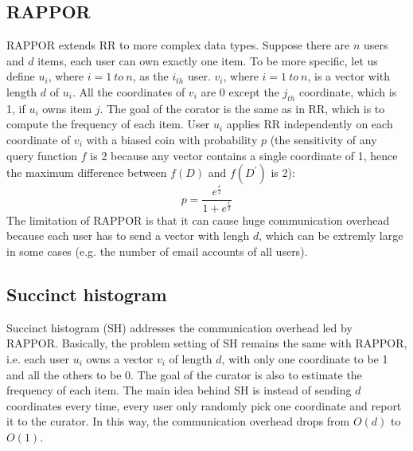 \documentclass[a4paper, 11pt]{article} %
\theoremstyle{definition}
\begin{document}
\subsection{RAPPOR}
RAPPOR\cite{erlingsson2014rappor,fanti2016building} extends RR\cite{erlingsson2014rappor} to more complex data types. Suppose there are $n$ users and $d$ items, each user can own exactly one item. To be more specific, let us define $u_i$, where $i=1 \ to \ n$, as the $i_{th}$ user. $v_i$, where $i=1 \ to \ n$, is a vector with length $d$ of $u_i$. All the coordinates of $v_i$ are 0 except the $j_{th}$ coordinate, which is 1, if $u_i$ owns item $j$. The goal of the corator is the same as in RR, which is to compute the frequency of each item. User $u_i$ applies RR independently on each coordinate of $v_i$ with a biased coin with probability $p$ (the sensitivity of any query function $f$ is 2 because any vector contains a single coordinate of 1, hence the maximum difference between $f(D)$ and $f(D^\prime)$ is 2):
\[ p = \frac{e^{\frac{\epsilon}{2}}}{1+e^{\frac{\epsilon}{2}}} \]
The limitation of RAPPOR is that it can cause huge communication overhead because each user has to send a vector with lengh $d$, which can be extremly large in some cases (e.g. the number of email accounts of all users).

\subsection{Succinct histogram}
Succinct histogram (SH)\cite{bassily2015local} addresses the communication overhead led by RAPPOR\cite{erlingsson2014rappor,fanti2016building}. Basically, the problem setting of SH remains the same with RAPPOR, i.e. each user $u_i$ owns a vector $v_i$ of length $d$, with only one coordinate to be 1 and all the others to be 0. The goal of the curator is also to estimate the frequency of each item. The main idea behind SH is instead of sending $d$ coordinates every time, every user only randomly pick one coordinate and report it to the curator. In this way, the communication overhead drops from $O(d)$ to $O(1)$. 
\end{document}

